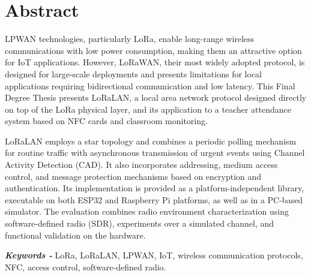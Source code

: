 \renewcommand{\keywords}{{\itshape \bfseries Keywords - }}
\chapter*{Abstract}


LPWAN technologies, particularly LoRa, enable long-range wireless communications with low power consumption, making them an attractive option for IoT applications. However, LoRaWAN, their most widely adopted protocol, is designed for large-scale deployments and presents limitations for local applications requiring bidirectional communication and low latency. This Final Degree Thesis presents LoRaLAN, a local area network protocol designed directly on top of the LoRa physical layer, and its application to a teacher attendance system based on NFC cards and classroom monitoring.

LoRaLAN employs a star topology and combines a periodic polling mechanism for routine traffic with asynchronous transmission of urgent events using Channel Activity Detection (CAD). It also incorporates addressing, medium access control, and message protection mechanisms based on encryption and authentication. Its implementation is provided as a platform-independent library, executable on both ESP32 and Raspberry Pi platforms, as well as in a PC-based simulator. The evaluation combines radio environment characterization using software-defined radio (SDR), experiments over a simulated channel, and functional validation on the hardware.

\keywords{LoRa, LoRaLAN, LPWAN, IoT, wireless communication protocols, NFC, access control, software-defined radio.}